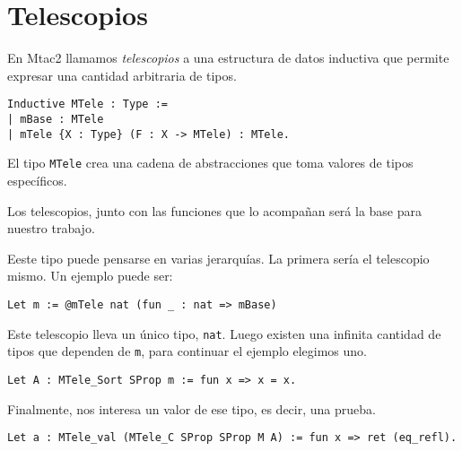 \section{Telescopios}

En Mtac2 llamamos \textit{telescopios} a una estructura de datos inductiva
que permite expresar una cantidad arbitraria de tipos.

\begin{lstlisting}
Inductive MTele : Type :=
| mBase : MTele
| mTele {X : Type} (F : X -> MTele) : MTele.
\end{lstlisting}

El tipo \lstinline{MTele} crea una cadena de abstracciones que toma valores de tipos específicos.

Los telescopios, junto con las funciones que lo acompañan será la base para nuestro
trabajo.

Eeste tipo puede pensarse en varias jerarquías.
La primera sería el telescopio mismo.
Un ejemplo puede ser:

\begin{lstlisting}
Let m := @mTele nat (fun _ : nat => mBase)
\end{lstlisting}

Este telescopio lleva un único tipo, \lstinline{nat}.
Luego existen una infinita cantidad de tipos que dependen de \lstinline{m}, para
continuar el ejemplo elegimos uno.

\begin{lstlisting}
Let A : MTele_Sort SProp m := fun x => x = x.
\end{lstlisting}

Finalmente, nos interesa un valor de ese tipo, es decir, una prueba.

\begin{lstlisting}
Let a : MTele_val (MTele_C SProp SProp M A) := fun x => ret (eq_refl).
\end{lstlisting}

